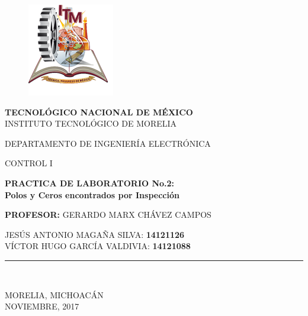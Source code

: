 \documentclass[letterpaper,10pt]{article}
\begin{document}
	
\begin{titlepage}
	
	\begin{center}
		\vspace*{-1in}
		\begin{figure}[htb]
			\centering
			\includegraphics[scale=1.5]{ESCUDO}
		\end{figure}
		
		\textbf{TECNOLÓGICO NACIONAL DE MÉXICO}\\
		\vspace*{0.15in}
		INSTITUTO TECNOLÓGICO DE MORELIA \\
		\vspace*{0.3in}
		\begin{large}
			DEPARTAMENTO DE INGENIERÍA ELECTRÓNICA\\
		\end{large}
		\vspace*{0.2in}
		\begin{large}
			CONTROL I\\
		\end{large}
		\vspace*{0.3in}
		\begin{Large}
			\textbf{PRACTICA DE LABORATORIO No.2: \\
			Polos y Ceros encontrados por Inspección}\\ 
		\end{Large}
		\vspace*{0.3in}
		\begin{large}
		\textbf{PROFESOR:} GERARDO MARX CHÁVEZ CAMPOS\\
		\end{large}
		\vspace*{0.2in}
		\begin{large}
			JESÚS ANTONIO MAGAÑA SILVA: \textbf{14121126}\\
			VÍCTOR HUGO GARCÍA VALDIVIA: \textbf{14121088}
		\end{large}
		\vspace*{0.3in}
		\rule{80mm}{0.1mm}\\
		\vspace*{0.1in}
		\begin{large}
			MORELIA, MICHOACÁN \\
			NOVIEMBRE, 2017 \\
		\end{large}
	\end{center}
\end{titlepage}
\end{document}
